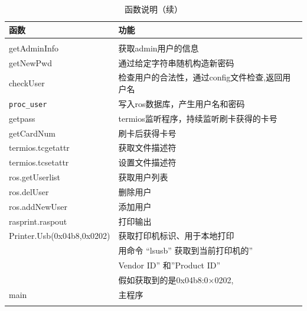 \begin{longtable}{l|l}
  \caption{函数说明}\\\hline
  函数 & 功能 \\\hline\endfirsthead
  \caption{函数说明（续）}\\\hline\endhead
  getAdminInfo & 获取admin用户的信息\\
  getNewPwd & 通过给定字符串随机构造新密码\\
  checkUser & 检查用户的合法性，通过config文件检查,返回用户名\\
  \verb|proc_user| & 写入ros数据库，产生用户名和密码\\
  getpass & termios监听程序，持续监听刷卡获得的卡号\\
  getCardNum & 刷卡后获得卡号\\
  termios.tcgetattr & 获取文件描述符\\
  termios.tcsetattr & 设置文件描述符\\
  ros.getUserlist & 获取用户列表\\
  ros.delUser & 删除用户\\
  ros.addNewUser & 添加用户\\
  rasprint.raspout & 打印输出\\
  Printer.Usb(0x04b8,0x0202) & 获取打印机标识、用于本地打印\\
  &用命令 “lsusb” 获取到当前打印机的”\\
  &Vendor ID” 和”Product ID”\\
  &假如获取到的是0x04b8:0×0202,\\
  main & 主程序\\
  \label{tab:functions}
\end{longtable}

